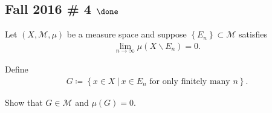 \hypertarget{fall-2016-4-done}{%
\subsection{\texorpdfstring{Fall 2016 \# 4
\(\done\)}{Fall 2016 \# 4 \textbackslash done}}\label{fall-2016-4-done}}

Let \((X, \mathcal M, \mu)\) be a measure space and suppose
\(\left\{{E_n}\right\} \subset \mathcal M\) satisfies
\begin{align*}
\lim _{n \rightarrow \infty} \mu\left(X \backslash E_{n}\right)=0.
\end{align*}

Define
\begin{align*}
G \coloneqq\left\{{x\in X {~\mathrel{\Big|}~}x\in E_n \text{ for only finitely many  } n}\right\}.
\end{align*}

Show that \(G \in \mathcal M\) and \(\mu(G) = 0\).


